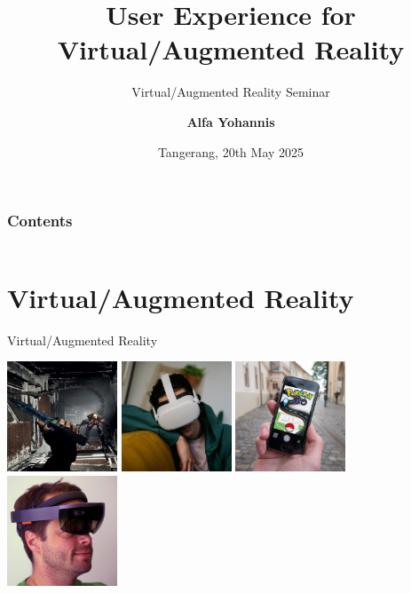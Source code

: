 \documentclass[aspectratio=169, table]{beamer}
\subtitle{Virtual/Augmented Reality Seminar}
\title{\LARGE{User Experience for\\Virtual/Augmented Reality\\\vspace{10pt}}}
\date[Serial]{\scriptsize {Tangerang, 20th May 2025 }}
\author[Pradita]{\small {\textbf{Alfa Yohannis}}}
\begin{document}
\frame{\titlepage}

\begin{frame}[fragile]
\frametitle{Contents}
\vspace{20pt}
\begin{columns}[t]
\tableofcontents[sections={1-5}]

\tableofcontents[sections={6-10}]
\end{columns}
\end{frame}


\section{Virtual/Augmented Reality}
\begin{frame}{Virtual/Augmented Reality}
	\vspace{20pt}
	
	
	\includegraphics[width=0.246\textwidth, keepaspectratio=true]{../figures/resident_evil.jpg}
	\includegraphics[width=0.246\textwidth,  keepaspectratio=true]{../figures/oculus.jpg} 
	\includegraphics[width=0.246\textwidth, keepaspectratio=true]{../figures/pokemon.jpg} 
	\includegraphics[width=0.246\textwidth,  keepaspectratio=true]{../figures/hololens.jpg}
	

\end{frame}
\end{document}
